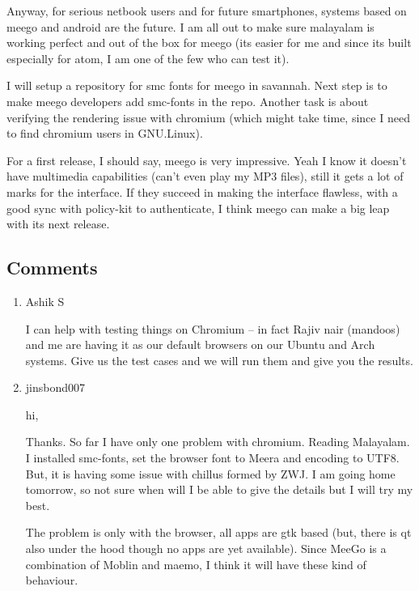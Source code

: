 {Anyway, for serious netbook users and for future smartphones, systems based on meego and android are the 
future. I am all out to make sure malayalam is working perfect and out of the box for meego (its easier 
for me and since its built especially for atom, I am one of the few who can test it).

I will setup a repository for smc fonts for meego in savannah. Next step is to make meego developers add smc-fonts 
in the repo. Another task is about verifying the rendering issue with chromium (which might take time, since I need to 
find chromium users in GNU.Linux).

For a first release, I should say, meego is very impressive. Yeah I know it doesn't have multimedia capabilities (can't even 
play my MP3 files), still it gets a lot of marks for the interface. If they succeed in making the interface flawless, 
with a good sync with policy-kit to authenticate, I think meego can make a big leap with its next release.


\subsection*{Comments}
\begin{enumerate}
 \item{Ashik S}
 
I can help with testing things on Chromium – in fact Rajiv nair (mandoos) and me are having it as our default browsers on 
our Ubuntu and Arch systems. Give us the test cases and we will run them and give you the results.

 \item{jinsbond007}
 
hi,

Thanks. So far I have only one problem with chromium. Reading Malayalam.
I installed smc-fonts, set the browser font to Meera and encoding to UTF8. But, it is having some issue with chillus 
formed by ZWJ.
I am going home tomorrow, so not sure when will I be able to give the details but I will try my best. 

The problem is only with the browser, all apps are gtk based (but, there is qt also under the hood though no apps 
are yet available). Since MeeGo is a combination of Moblin and maemo, I think it will have these kind of behaviour. 

\end{enumerate}
}
\newpage 
